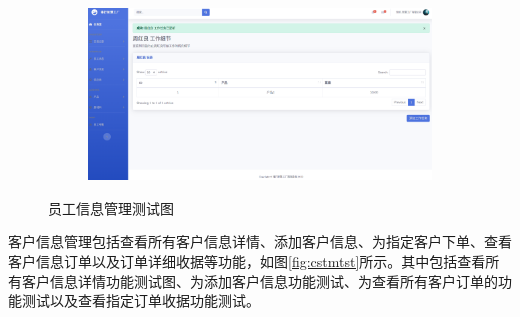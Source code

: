 \begin{figure}[H]
\begin{subfigure}{.45\textwidth}
    \end{subfigure}
    \qquad
    \begin{subfigure}{.45\textwidth}
        \centering
        \includegraphics[width=\textwidth]{figures/6addwork.png}
    \end{subfigure}
    \caption{员工信息管理测试图}
    \label{fig:emploetest}
\end{figure}

客户信息管理包括查看所有客户信息详情、添加客户信息、为指定客户下单、查看客户信息订单以及订单详细收据等功能，如图\ref{fig:cstmtst}所示。其中包括查看所有客户信息详情功能测试图、为添加客户信息功能测试、为查看所有客户订单的功能测试以及查看指定订单收据功能测试。

